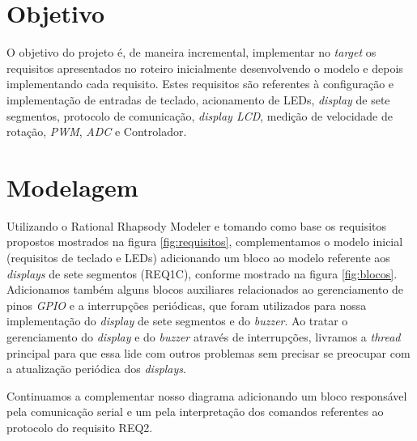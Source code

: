 \documentclass{article}
\begin{document}


\onehalfspacing
\section{Objetivo} 
O objetivo do projeto é, de maneira incremental, implementar no \textit{target} os requisitos apresentados no roteiro\cite{bb:roteiro} inicialmente desenvolvendo o modelo e depois implementando cada requisito. Estes requisitos são referentes à configuração e implementação de entradas de teclado, acionamento de LEDs, \textit{display} de sete segmentos, protocolo de comunicação, \textit{display LCD}, medição de velocidade de rotação, \textit{PWM}, \textit{ADC} e Controlador. 
	
\section{Modelagem}
Utilizando o Rational Rhapsody Modeler e tomando como base os requisitos propostos mostrados na figura \ref{fig:requisitos}, complementamos o modelo inicial\cite{bb:modelo} (requisitos de teclado e LEDs) adicionando um bloco ao modelo referente aos \textit{displays} de sete segmentos (REQ1C), conforme mostrado na figura \ref{fig:blocos}. Adicionamos também alguns blocos auxiliares relacionados ao gerenciamento de pinos \textit{GPIO} e a interrupções periódicas, que foram utilizados para nossa implementação do \textit{display} de sete segmentos e do \textit{buzzer}. Ao tratar o gerenciamento do \textit{display} e do \textit{buzzer} através de interrupções, livramos a \textit{thread} principal para que essa lide com outros problemas sem precisar se preocupar com a atualização periódica dos \textit{displays}.

Continuamos a complementar nosso diagrama adicionando um bloco responsável pela comunicação serial e um pela interpretação dos comandos referentes ao protocolo do requisito REQ2.
\end{document}
